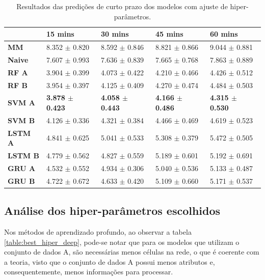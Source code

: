 \begin{table}[H]
    \begin{tabular*}{\linewidth}{@{\extracolsep{\fill}}lllll}
    \toprule
     & 
    \multicolumn{1}{l}{\textbf{15 mins}} & 
    \multicolumn{1}{l}{\textbf{30 mins}} &
    \multicolumn{1}{l}{\textbf{45 mins}} &
    \multicolumn{1}{l}{\textbf{60 mins}} \\
\midrule
\textbf{MM} & 8.352 $\pm$ 0.820 & 8.592 $\pm$ 0.846 & 8.821 $\pm$ 0.866 & 9.044 $\pm$ 0.881
\\
\midrule
\textbf{Naive} & 7.607 $\pm$ 0.993 & 7.636 $\pm$ 0.839 & 7.665 $\pm$ 0.768 & 7.863 $\pm$ 0.889
\\
\midrule
\textbf{RF A} & 3.904 $\pm$ 0.399 & 4.073 $\pm$ 0.422 & 4.210 $\pm$ 0.466 & 4.426 $\pm$ 0.512
\\
\midrule
\textbf{RF B} & 3.954 $\pm$ 0.397 & 4.125 $\pm$ 0.409 & 4.270 $\pm$ 0.474 & 4.484 $\pm$ 0.503
\\
\midrule
\textbf{SVM A} & \textbf{3.878 $\pm$ 0.423} & \textbf{4.058 $\pm$ 0.443} & \textbf{4.166 $\pm$ 0.486} & \textbf{4.315 $\pm$ 0.530}
\\
\midrule
\textbf{SVM B} & 4.126 $\pm$ 0.336 & 4.321 $\pm$ 0.384 & 4.466 $\pm$ 0.469 & 4.619 $\pm$ 0.523
\\
\midrule
\textbf{LSTM A} & 4.841 $\pm$ 0.625 & 5.041 $\pm$ 0.533 & 5.308 $\pm$ 0.379 & 5.472 $\pm$ 0.505
\\
\midrule
\textbf{LSTM B} & 4.779 $\pm$ 0.562 & 4.827 $\pm$ 0.559 & 5.189 $\pm$ 0.601 & 5.192 $\pm$ 0.691
\\
\midrule
\textbf{GRU A} & 4.532 $\pm$ 0.552 & 4.934 $\pm$ 0.306 & 5.040 $\pm$ 0.536 & 5.133 $\pm$ 0.487
\\
\midrule
\textbf{GRU B} & 4.722 $\pm$ 0.672 & 4.633 $\pm$ 0.420 & 5.109 $\pm$ 0.660 & 5.171 $\pm$ 0.537
\\
    \bottomrule
    \end{tabular*}
    \label{table:curto_prazo_tuning}
    \caption{Resultados das predições de curto prazo dos modelos com ajuste de hiper-parâmetros.}
\end{table}

\subsection{Análise dos hiper-parâmetros escolhidos}

Nos métodos de aprendizado profundo, ao observar a tabela \ref{table:best_hiper_deep}, pode-se notar que para os modelos que utilizam o conjunto de dados A, são necessárias menos células na rede, o que é coerente com a teoria, visto que o conjunto de dados A possui menos atributos e, consequentemente, menos informações para processar.

